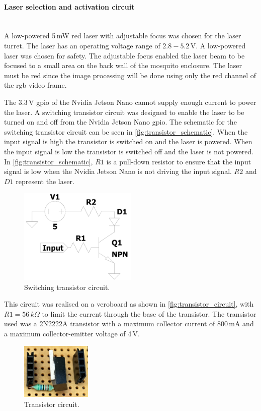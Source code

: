 \paragraph{Laser selection and activation circuit}\hfill\\
A low-powered 5\,mW red laser with adjustable focus was chosen for the laser turret. The laser has an operating voltage range of $2.8 - 5.2$\,V. A low-powered laser was chosen for safety. The adjustable focus enabled the laser beam to be focused to a small area on the back wall of the mosquito enclosure. The laser must be red since the image processing will be done using only the red channel of the \gls{rgb} video frame.

The 3.3\,V \gls{gpio} of the Nvidia Jetson Nano cannot supply enough current to power the laser. A switching transistor circuit was designed to enable the laser to be turned on and off from the Nvidia Jetson Nano \gls{gpio}. The schematic for the switching transistor circuit can be seen in \autoref{fig:transistor_schematic}.  When the input signal is high the transistor is switched on and the laser is powered. When the input signal is low the transistor is switched off and the laser is not powered. In \autoref{fig:transistor_schematic}, $R1$ is a pull-down resistor to ensure that the input signal is low when the Nvidia Jetson Nano is not driving the input signal. $R2$ and $D1$ represent the laser.
\begin{figure}[h]
    \centering
    \includegraphics[width=0.5\textwidth]{figures/hardware_design/laser_transistor_schematic.pdf}
    \caption{Switching transistor circuit.}
    \label{fig:transistor_schematic}
\end{figure}
This circuit was realised on a veroboard as shown in \autoref{fig:transistor_circuit}, with $R1 = 56\,k\Omega$ to limit the current through the base of the transistor. The transistor used was a 2N2222A transistor with a maximum collector current of 800\,mA and a maximum collector-emitter voltage of 4\,V.
\begin{figure}[h]
    \centering
    \includegraphics[width=0.3\textwidth]{figures/hardware_design/transistor_circuit.jpg}
    \caption{Transistor circuit.}
    \label{fig:transistor_circuit}
\end{figure}


